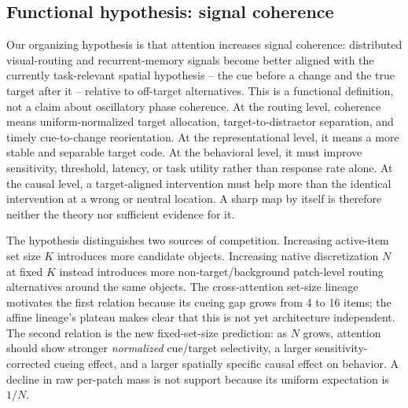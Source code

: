 \documentclass[10pt]{article}
\begin{document}
\subsection{Functional hypothesis: signal coherence}\label{sec:coherence-hypothesis}
Our organizing hypothesis is that attention increases signal coherence: distributed visual-routing and recurrent-memory signals become better aligned with the currently task-relevant spatial hypothesis -- the cue before a change and the true target after it -- relative to off-target alternatives. This is a functional definition, not a claim about oscillatory phase coherence. At the routing level, coherence means uniform-normalized target allocation, target-to-distractor separation, and timely cue-to-change reorientation. At the representational level, it means a more stable and separable target code. At the behavioral level, it must improve sensitivity, threshold, latency, or task utility rather than response rate alone. At the causal level, a target-aligned intervention must help more than the identical intervention at a wrong or neutral location. A sharp map by itself is therefore neither the theory nor sufficient evidence for it.

The hypothesis distinguishes two sources of competition. Increasing active-item set size $K$ introduces more candidate objects. Increasing native discretization $N$ at fixed $K$ instead introduces more non-target/background patch-level routing alternatives around the same objects. The cross-attention set-size lineage motivates the first relation because its cueing gap grows from 4 to 16 items; the affine lineage's plateau makes clear that this is not yet architecture independent. The second relation is the new fixed-set-size prediction: as $N$ grows, attention should show stronger \emph{normalized} cue/target selectivity, a larger sensitivity-corrected cueing effect, and a larger spatially specific causal effect on behavior. A decline in raw per-patch mass is not support because its uniform expectation is $1/N$.
\end{document}
